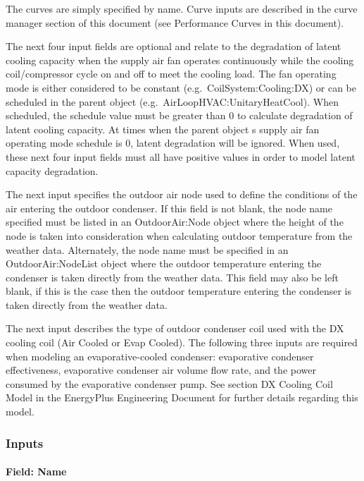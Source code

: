 The curves are simply specified by name. Curve inputs are described in the curve manager section of this document (see Performance Curves in this document).

The next four input fields are optional and relate to the degradation of latent cooling capacity when the supply air fan operates continuously while the cooling coil/compressor cycle on and off to meet the cooling load. The fan operating mode is either considered to be constant (e.g.~CoilSystem:Cooling:DX) or can be scheduled in the parent object (e.g.~AirLoopHVAC:UnitaryHeatCool). When scheduled, the schedule value must be greater than 0 to calculate degradation of latent cooling capacity. At times when the parent object s supply air fan operating mode schedule is 0, latent degradation will be ignored. When used, these next four input fields must all have positive values in order to model latent capacity degradation.

The next input specifies the outdoor air node used to define the conditions of the air entering the outdoor condenser. If this field is not blank, the node name specified must be listed in an OutdoorAir:Node object where the height of the node is taken into consideration when calculating outdoor temperature from the weather data. Alternately, the node name must be specified in an OutdoorAir:NodeList object where the outdoor temperature entering the condenser is taken directly from the weather data. This field may also be left blank, if this is the case then the outdoor temperature entering the condenser is taken directly from the weather data.

The next input describes the type of outdoor condenser coil used with the DX cooling coil (Air Cooled or Evap Cooled). The following three inputs are required when modeling an evaporative-cooled condenser: evaporative condenser effectiveness, evaporative condenser air volume flow rate, and the power consumed by the evaporative condenser pump. See section DX Cooling Coil Model in the EnergyPlus Engineering Document for further details regarding this model.

\subsubsection{Inputs}\label{inputs-18-001}

\paragraph{Field: Name}\label{field-name-17-001}


